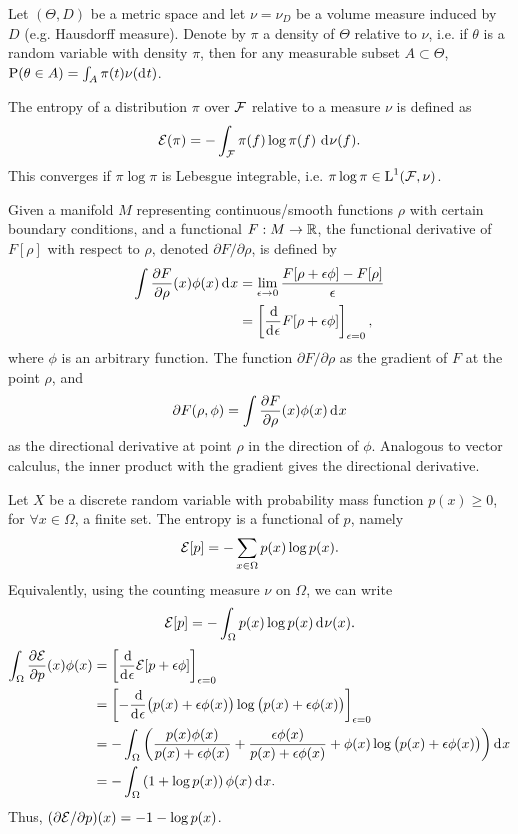 \documentclass[a4paper,showframe,11pt,draft]{report}
\begin{document}
Let $(\Theta,D)$ be a metric space and let $\nu = \nu_D$ be a volume measure induced by $D$ (e.g. Hausdorff measure).
  Denote by $\pi$ a density of $\Theta$ relative to $\nu$, i.e. if $\theta$ is a random variable with density $\pi$, then for any measurable subset $A \subset \Theta$, $\operatorname{P}(\theta \in A) = \int_A \pi(t)\nu(\operatorname{d\!\:\!} t)$.


\begin{definition}[Entropy]
  The entropy of a distribution $\pi$ over ${\mathcal F}$ relative to a measure $\nu$ is defined as
  \[
    {\mathcal E}(\pi) = - \int_{\mathcal F} \pi(f) \log \pi(f) \, \operatorname{d\!\:\!}\nu(f).
  \]
  This converges if $\pi \log\pi$ is Lebesgue integrable, i.e. $\pi\log\pi \in \text{L}^1({\mathcal F},\nu)$.
\end{definition}

\begin{definition}
  Given a manifold $M$ representing continuous/smooth functions $\rho$ with certain boundary conditions, and a functional $F:M\to\mathbb{R}$, the functional derivative of $F[\rho]$ with respect to $\rho$, denoted $\partial F/\partial\rho$, is defined by
  \begin{align*}
    \int \frac{\partial F}{\partial\rho}(x)\phi(x)\operatorname{d\!\:\!} x
    &= \lim_{\epsilon\to 0} \frac{F[\rho + \epsilon\phi] - F[\rho]}{\epsilon} \\
    &= \left[ \frac{\operatorname{d\!\:\!}}{\operatorname{d\!\:\!} \epsilon} F[\rho + \epsilon\phi] \right]_{\epsilon=0},
  \end{align*}
  where $\phi$ is an arbitrary function.
  The function $\partial F/\partial\rho$ as the gradient of $F$ at the point $\rho$, and
  \[
    \partial F(\rho,\phi) = \int \frac{\partial F}{\partial\rho}(x)\phi(x) \operatorname{d\!\:\!} x
  \]
  as the directional derivative at point $\rho$ in the direction of $\phi$.
  Analogous to vector calculus, the inner product with the gradient gives the directional derivative.
\end{definition}

\begin{example}
  Let $X$ be a discrete random variable with probability mass function $p(x) \geq 0$, for $\forall x \in \Omega$, a finite set.
  The entropy is a functional of $p$, namely
  \[
    {\mathcal E}[p] = - \sum_{x\in\Omega} p(x)\log p(x).
  \]
  Equivalently, using the counting measure $\nu$ on $\Omega$, we can write
  \[
    {\mathcal E}[p] = -\int_\Omega p(x) \log p(x) \operatorname{d\!\:\!}\nu(x).
  \]
  \begin{align*}
    \int_\Omega \frac{\partial\cE}{\partial p}(x)\phi(x) 
    &= \left[ \frac{\d}{\d \epsilon} \cE[p +  \epsilon\phi] \right]_{\epsilon=0} \\
    &= \left[ -\frac{\d}{\d \epsilon} 
    \big( p(x) + \epsilon\phi(x) \big) 
    \log \big(p(x) + \epsilon\phi(x) \big) 
    \right]_{\epsilon=0} \\
    &= -\int_\Omega \left( 
    \frac{p(x)\phi(x)}{p(x)+\epsilon\phi(x)}
    + \frac{\epsilon\phi(x)}{p(x) + \epsilon\phi(x)}
    + \phi(x)\log\big( p(x) + \epsilon\phi(x) \big)
    \right) \d x \\
    &= -\int_\Omega \left( 1 + \log p(x) \right) \phi(x) \d x.
  \end{align*}
  Thus, $(\partial{\mathcal E}/\partial p)(x) = -1 -\log p(x)$.
\end{example}
\end{document}

